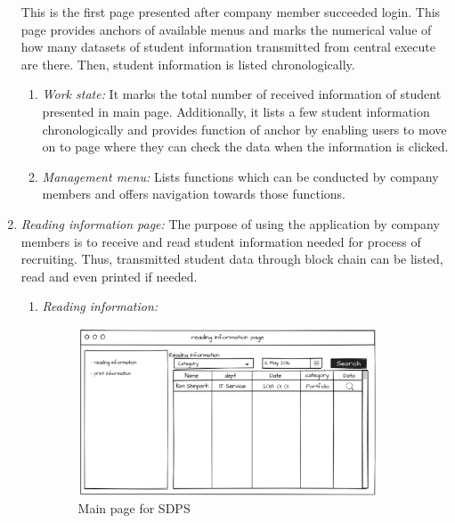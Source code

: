 \documentclass[conference]{IEEEtran}
\begin{document}
\begin{enumerate}
    This is the first page presented after company member succeeded login. This page provides anchors of available menus and marks the numerical value of how many datasets of student information transmitted from central execute are there. Then, student information is listed chronologically.\\
    \begin{enumerate}
    	\item  \textit {Work state:} It marks the total number of received information of student presented in main page. Additionally, it lists a few student information chronologically and provides function of anchor by enabling users to move on to page where they can check the data when the information is clicked.\\
        \item  \textit {Management menu:} Lists functions which can be conducted by company members and offers navigation towards those functions.\\
    \end{enumerate}
    
       \item \textit {Reading information page:} The purpose of using the application by company members is to receive and read student information needed for process of recruiting. Thus, transmitted student data through block chain can be listed, read and even printed if needed.\\
       
     \vspace{70mm}  
    \begin{enumerate}
    	\item   \textit {Reading information:} 
	 \begin{figure}[htbp]
	\centerline{\includegraphics[width=89mm,scale=0.5]{company/func1.png}}
	\caption{Main page for SDPS}
	\label{fig}
	\end{figure}
	

\end{enumerate}
\end{enumerate}
\end{document}
